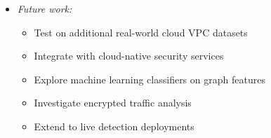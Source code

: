 \documentclass[letterpaper,twocolumn,10pt]{article}
\begin{document}
\begin{itemize}
\item \textit{Future work:}
\begin{itemize}
\item Test on additional real-world cloud VPC datasets
\item Integrate with cloud-native security services
\item Explore machine learning classifiers on graph features
\item Investigate encrypted traffic analysis
\item Extend to live detection deployments
\end{itemize}
\end{itemize}

{\footnotesize 
}
\end{document}
